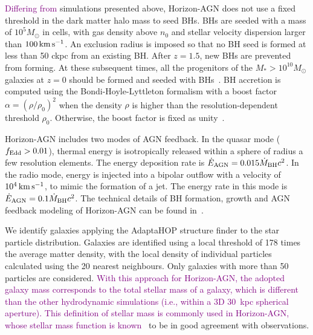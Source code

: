 \documentclass[twocolumn]{aastex631}
\newcommand{\todo}[1]{\textcolor{red}{[{\bf TODO}: #1]}}
\newcommand{\red}[1]{\textcolor{purple}{#1}}
\def\smass{{$M_*$}}
\begin{document}

\red{Differing from} simulations presented above, Horizon-AGN does not use a fixed threshold in the dark matter halo mass to seed BHs.  BHs are seeded with a mass of $10^5 M_\odot$ in cells, with gas density above $n_0$ and stellar velocity dispersion larger than $100 \,\rm km\,s^{-1}$. An exclusion radius is imposed so that no BH seed is formed at less than 50 ckpc from an existing BH. After $z = 1.5$, new BHs are prevented from forming. At these subsequent times, all the progenitors of the \smass$>10^{10} M_{\odot}$ galaxies at $z = 0$ should be formed and seeded with BHs~\citep{2016MNRAS.460.2979V}.  BH accretion is computed using the Bondi-Hoyle-Lyttleton formalism with a boost factor $\alpha = (\rho/\rho_0)^2$ when the density $\rho$ is higher than the resolution-dependent threshold $\rho_0$. Otherwise, the boost factor is fixed as unity~\citep{2009MNRAS.398...53B}.

Horizon-AGN includes two modes of AGN feedback. In the quasar mode ($f_{\rm Edd}>0.01$), thermal energy is isotropically released within a sphere of radius a few resolution elements. The energy deposition rate is $\dot{E}_{\rm AGN} = 0.015 \dot{M}_{\rm BH} c^2$. In the radio mode, energy is injected into a bipolar  outflow  with  a  velocity  of  $10^4\,\rm km\,s^{-1}$, to  mimic the  formation  of  a  jet.  The  energy  rate  in  this  mode is $\dot{E}_{\rm AGN} = 0.1 \dot{M}_{\rm BH} c^2$.  The  technical  details  of  BH  formation,  growth  and AGN  feedback  modeling  of  Horizon-AGN  can be found in~\citet{2012MNRAS.420.2662D}.

We identify galaxies applying the AdaptaHOP structure finder \citep{Aubert+04,Tweed+09} to the star particle distribution.  Galaxies are identified using a local threshold of 178 times the average matter density, with the local density of individual particles calculated using the 20 nearest neighbours. Only galaxies with more than 50 particles are considered. \red{With this approach for Horizon-AGN, the adopted galaxy mass corresponds to the total stellar mass of a galaxy, which is different than the other hydrodynamic simulations (i.e., within a 3D 30~kpc spherical aperture). This definition of stellar mass is commonly used in Horizon-AGN, whose stellar mass function is known~\citep{2017MNRAS.467.4739K}} to be in good agreement with observations.
\end{document}
